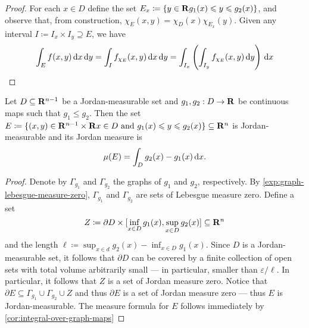 \begin{proof}
    For each \(x \in D\) define the set \(E_x \coloneq \{y \in \mathbf{R} \relax g_{1}(x) \leqslant y
    \leqslant g_2(x)\}\), and observe that, from construction, \(\chi_E(x, y) = \chi_D(x)
    \chi_{E_x}(y)\). Given any interval \(I \coloneq I_x \times I_y \supseteq E\),
    we have
    \begin{align*}
        \int_E f(x, y)\, \mathrm{d} x\, \mathrm{d} y
        = \int_I f_{\chi_E}(x, y)\, \mathrm{d} x\, \mathrm{d} y
        = \int_{I_x} \left( \int_{I_y} f_{\chi_E}(x, y)\, \mathrm{d} y  \right)\, \mathrm{d} x
    \end{align*}
\end{proof}

\begin{corollary}
    \label{cor:measure-set-between-graphs-of-continuous-maps}
    Let \(D \subseteq \mathbf{R}^{n-1}\) be a Jordan-measurable set and \(g_1, g_2: D \to
    \mathbf{R}\) be continuous maps such that \(g_1 \leq g_2\). Then the set \(E \coloneq
    \{(x, y) \in \mathbf{R}^{n-1} \times \mathbf{R} \relax x \in D \text{ and } g_1(x) \leqslant y \leqslant
    g_2(x)\} \subseteq \mathbf{R}^n\) is Jordan-measurable and its Jordan measure is
    \[
        \mu(E) = \int_D g_2(x) - g_1(x)\, \mathrm{d} x.
    \]
\end{corollary}

\begin{proof}
    Denote by \(\Gamma_{g_1}\) and \(\Gamma_{g_2}\) the graphs of \(g_1\) and
    \(g_2\), respectively. By \cref{exp:graph-lebesgue-measure-zero},
    \(\Gamma_{g_1}\) and \(\Gamma_{g_2}\) are sets of Lebesgue measure
    zero. Define a set
    \[
        Z \coloneq \partial D \times
        [\inf_{x \in D} g_1(x), \sup_{x \in D} g_2(x)] \subseteq \mathbf{R}^n
    \] and the length \(\ell \coloneq \sup_{x
        \in d} g_2(x) - \inf_{x \in D} g_1(x)\). Since \(D\) is a Jordan-measurable set,
    it follows that \(\partial D\) can be covered by a finite collection of open
    sets with total volume arbitrarily small --- in particular, smaller than
    \(\varepsilon / \ell\). In particular, it follows that \(Z\) is a set of Jordan
    measure zero. Notice that \(\partial E \subseteq \Gamma_{g_1} \cup
    \Gamma_{g_2} \cup Z\) and thus \(\partial E\) is a set of Jordan measure zero
    --- thus \(E\) is Jordan-measurable. The measure formula for \(E\) follows
    immediately by \cref{cor:integral-over-graph-maps}
\end{proof}

